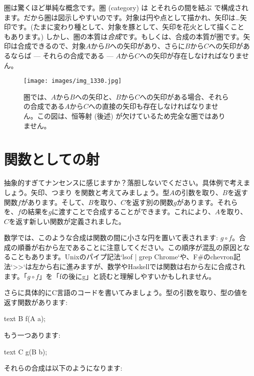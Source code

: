 
\lettrine[lhang=0.17]{圏}{は}驚くほど単純な概念です。圏 (category) は とそれらの間を結ぶ で構成されます。だから圏は図示しやすいのです。対象は円や点として描かれ、矢印は\ldots{}矢印です。(たまに変わり種として、対象を豚として、矢印を花火として描くこともあります。) しかし、圏の本質は\emph{合成}です。もしくは、合成の本質が圏です。矢印は合成できるので、対象$A$から$B$への矢印があり、さらに$B$から$C$への矢印があるならば --- それらの合成である --- $A$から$C$への矢印が存在しなければなりません。

\begin{figure}
  \centering
  \texttt{[image: images/img\_1330.jpg]}
  \caption{圏では、$A$から$B$への矢印と、$B$から$C$への矢印がある場合、それらの合成である$A$から$C$への直接の矢印も存在しなければなりません。この図は、恒等射 (後述) が欠けているため完全な圏ではありません。}
\end{figure}

\section{関数としての射}

抽象的すぎてナンセンスに感じますか？落胆しないでください。具体例で考えましょう。矢印、つまり を関数と考えてみましょう。型$A$の引数を取り、$B$を返す関数$f$があります。そして、$B$を取り、$C$を返す別の関数$g$があります。それらを、$f$の結果を$g$に渡すことで合成することができます。これにより、$A$を取り、$C$を返す新しい関数が定義されました。

数学では、このような合成は関数の間に小さな円を置いて表されます: $g \circ f$。合成の順番が右から左であることに注意してください。この順序が混乱の原因となることもあります。Unixのパイプ記法`lsof | grep Chrome`や、F\#のchevron記法`>>`は左から右に進みますが、数学やHaskellでは関数は右から左に合成されます。「$g \circ f$」を「fの後にg」と読むと理解しやすいかもしれません。

さらに具体的にC言語のコードを書いてみましょう。型の引数を取り、型の値を返す関数があります:

\begin{snip}{text}
B f(A a);
\end{snip}
もう一つあります:

\begin{snip}{text}
C g(B b);
\end{snip}
それらの合成は以下のようになります:

